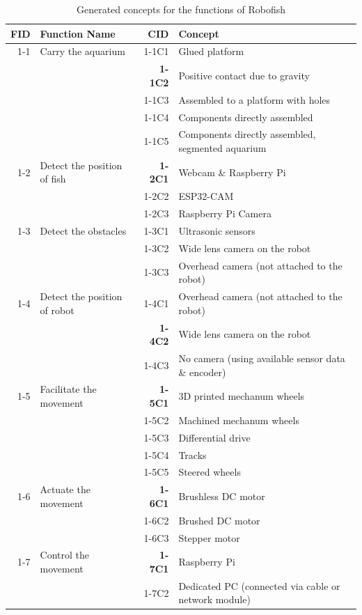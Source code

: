 \documentclass[a4paper, 10pt, DIV=16, parskip = full, twocolumn = false]{scrartcl}
\begin{document}

\begin{table}
\centering
\caption{Generated concepts for the functions of Robofish}
	\begin{tabular}{rlrl}
	\toprule
		FID & Function Name & CID & Concept \\
	\midrule
		1-1 & Carry the aquarium & 1-1C1 & Glued platform \\	
	 	& & \textbf{1-1C2} & Positive contact due to gravity \\	
		& & 1-1C3 & Assembled to a platform with holes \\	
		& & 1-1C4 & Components directly assembled \\	
		& & 1-1C5 & Components directly assembled, segmented aquarium \\	
		1-2 & Detect the position of fish & \textbf{1-2C1} & Webcam \& Raspberry Pi \\
		& & 1-2C2 & ESP32-CAM \\	
		& & 1-2C3 & Raspberry Pi Camera \\	
		1-3 & Detect the obstacles & 1-3C1 & Ultrasonic sensors \\
		& & 1-3C2 & Wide lens camera on the robot \\	
		& & 1-3C3 & Overhead camera (not attached to the robot) \\
		1-4 & Detect the position of robot & 1-4C1 & Overhead camera (not attached to the robot) \\	 
		& & \textbf{1-4C2} & Wide lens camera on the robot \\
		& & 1-4C3 & No camera (using available sensor data \& encoder) \\
		1-5 & Facilitate the movement & \textbf{1-5C1} & 3D printed mechanum wheels \\
		& & 1-5C2 & Machined mechanum wheels \\	
		& & 1-5C3 & Differential drive \\
		& & 1-5C4 & Tracks \\	
		& & 1-5C5 & Steered wheels \\
		1-6 & Actuate the movement & \textbf{1-6C1} & Brushless DC motor \\
		& & 1-6C2 & Brushed DC motor \\	
		& & 1-6C3 & Stepper motor \\
		1-7 & Control the movement & \textbf{1-7C1} & Raspberry Pi \\
		& & 1-7C2 & Dedicated PC (connected via cable or network module) \\	

\end{tabular}
\end{table}
\end{document}

